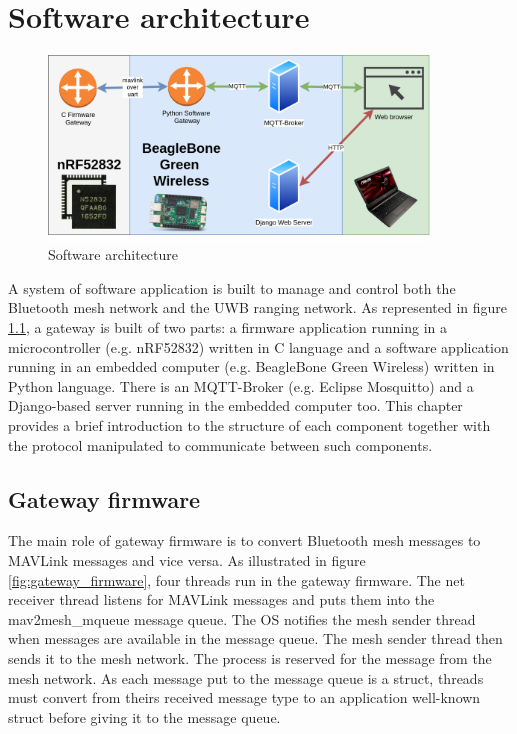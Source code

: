\documentclass[\main/main.tex]{subfiles}
\begin{document}
\graphicspath{{img/}{05_software/img/}}

\chapter{Software architecture}
\begin{figure}[H]
    \begin{center}
        \includegraphics[width=0.9\textwidth]{software_architecture.png}
    \end{center}
    \caption{Software architecture}
    \label{fig:software_architecture}
\end{figure}
A system of software application is built to manage and control both the Bluetooth mesh network and the UWB ranging network. As represented in figure \ref{fig:software_architecture}, a gateway is built of two parts: a firmware application running in a microcontroller (e.g. nRF52832) written in C language and a software application running in an embedded computer (e.g. BeagleBone Green Wireless) written in Python language. There is an  MQTT-Broker (e.g. Eclipse Mosquitto) and a Django-based server running in the embedded computer too. This chapter provides a brief introduction to the structure of each component together with  the protocol manipulated to communicate between such components.

\section{Gateway firmware}
The main role of gateway firmware is to convert Bluetooth mesh messages to MAVLink messages and vice versa. As illustrated in figure \ref{fig:gateway_firmware}, four threads run in the gateway firmware. The net receiver thread listens for MAVLink messages and puts them into the mav2mesh\_mqueue message queue. The OS notifies the mesh sender thread when messages are available in the message queue. The mesh sender thread then sends it to the mesh network. The process is reserved for the message from the mesh network. As each message put to the message queue is a struct, threads must convert from theirs received message type to an application well-known struct before giving it to the message queue.
\end{document}
